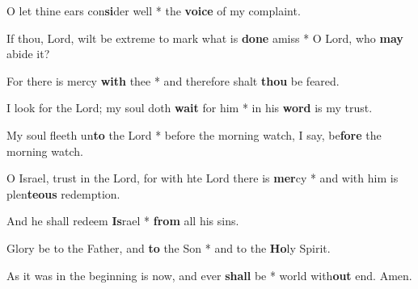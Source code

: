 \begin{multicols}{2}
	O let thine ears con\textbf{si}der well * the \textbf{voice} of my complaint.
	
	If thou, Lord, wilt be extreme to mark what is \textbf{done} amiss * O Lord, who \textbf{may} abide it?
	
	For there is mercy \textbf{with} thee * and therefore shalt \textbf{thou} be feared.
	
	I look for the Lord; my soul doth \textbf{wait} for him * in his \textbf{word} is my trust.
	
	My soul fleeth un\textbf{to} the Lord * before the morning watch, I say, be\textbf{fore} the morning watch.
	
	O Israel, trust in the Lord, for with hte Lord there is \textbf{mer}cy * and with him is plen\textbf{teous} redemption.
	
	And he shall redeem \textbf{Is}rael * \textbf{from} all his sins.
	
	Glory be to the Father, and \textbf{to} the Son * and to the \textbf{Ho}ly Spirit.
	
	As it was in the beginning is now, and ever \textbf{shall} be * world with\textbf{out} end. Amen.
\end{multicols}